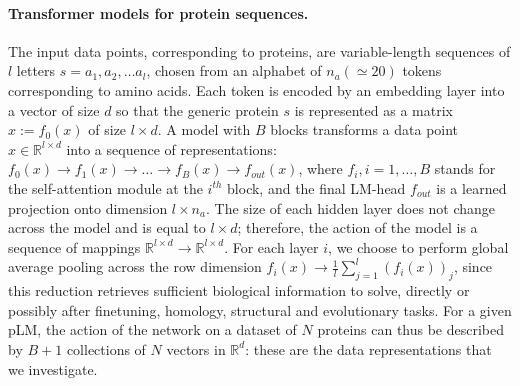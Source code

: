 \documentclass{article}
\begin{document}
\paragraph{Transformer models for protein sequences.}
The input data points, corresponding to proteins, are variable-length sequences of $l$ letters $s=a_1, a_2, \dots a_l$, chosen from an alphabet of $n_a(\simeq 20)$ tokens corresponding to amino acids. Each token is encoded by an embedding layer into a vector of size $d$ so that the generic protein $s$ is represented as a matrix $x:=f_0(x)$ of size $l \times d$. A model with $B$ blocks transforms a data point $x \in \mathbb{R}^{l\times d}$ into a sequence of representations: $f_0(x) \rightarrow f_1(x) \rightarrow \dots \rightarrow f_B(x) \rightarrow f_{out}(x)$, where $f_i, i=1,\ldots,B$ stands for the self-attention module at the $i^{th}$ block, and the final LM-head $f_{out}$ is a learned projection onto dimension $l\times n_a$. The size of each hidden layer does not change across the model and is equal to $l \times d$; therefore, the action of the model is a sequence of mappings $\mathbb{R}^{l\times d} \rightarrow \mathbb{R}^{l \times d}$.
%
%
For each layer $i$, we choose to perform global average pooling across the row dimension $f_i(x) \rightarrow \frac{1}{l} \sum_{j=1}^{l} (f_i(x))_j$, since this reduction retrieves sufficient biological information to solve, directly or possibly after finetuning, homology, structural and evolutionary tasks. 
%
For a given pLM, the action of the network on a dataset of $N$ proteins can thus be described by $B+1$ collections of $N$ vectors in $\mathbb{R}^{d}$: these are the data representations that we investigate.
%
\end{document}

